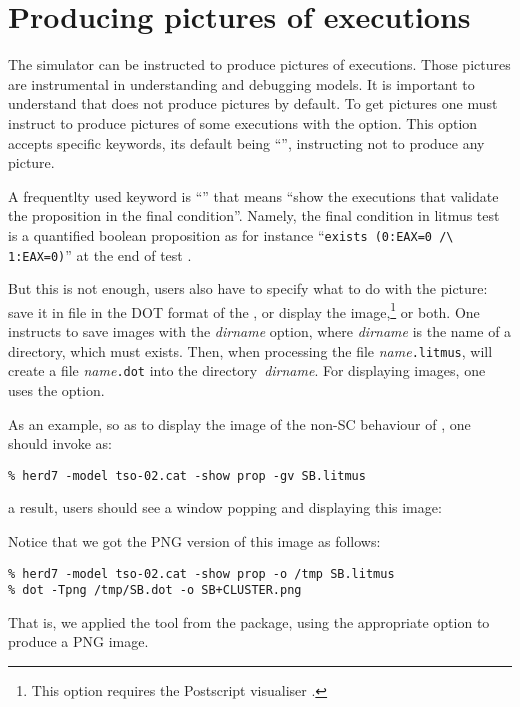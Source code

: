 \section{Producing pictures of executions}
The simulator \herd{} can be instructed to produce pictures of
executions.
Those pictures are instrumental in understanding and
debugging models.
It is important to understand that \herd{} does not produce pictures
by default. To get pictures one must instruct \herd{} to produce
pictures of some executions with the  option.
This option accepts specific keywords, its default being ``'',
instructing \herd{} not to produce any picture.

A frequentlty used keyword is ``'' that means ``show the executions
that validate the proposition in the final condition''.
Namely, the final condition in litmus test is a quantified
boolean proposition as for instance ``\verb+exists (0:EAX=0 /\ 1:EAX=0)+'' at the end of test .

But this is not enough, users also have to specify what to do with the picture:
save it in file in the DOT format of the
, or
display the image,\footnote{This option requires
the Postscript visualiser .} or both.
One instructs  \herd{} to save images with the \textit{dirname} option,
where \textit{dirname} is the name of a directory, which must exists.
Then, when processing the file \textit{name}\texttt{.litmus},
\herd{} will create a file \textit{name}\texttt{.dot} into the
directory~\textit{dirname}.
For displaying images, one uses the  option.

\label{sec:show}As an example,
so as to display the image of the non-SC behaviour of , one
should invoke \herd{} as:
\begin{verbatim}
% herd7 -model tso-02.cat -show prop -gv SB.litmus
\end{verbatim}
a result, users should see a window popping and displaying this image:
\begin{center}\end{center}
Notice that we got the PNG version of this image as follows:
\begin{verbatim}
% herd7 -model tso-02.cat -show prop -o /tmp SB.litmus
% dot -Tpng /tmp/SB.dot -o SB+CLUSTER.png
\end{verbatim}
That is, we applied the  tool from the
 package, using the appropriate option
to produce a PNG image.

